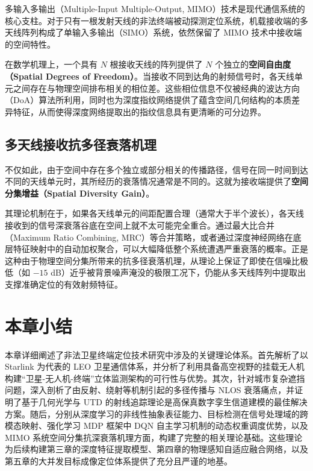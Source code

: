 多输入多输出（Multiple-Input Multiple-Output, MIMO）技术是现代通信系统的核心支柱。对于只有一根发射天线的非法终端被动探测定位系统，机载接收端的多天线阵列构成了单输入多输出（SIMO）系统，依然保留了 MIMO 技术中接收端的空间特性。

在数学机理上，一个具有 $N$ 根接收天线的阵列提供了 $N$ 个独立的\textbf{空间自由度（Spatial Degrees of Freedom）}。当接收不同到达角的射频信号时，各天线单元之间存在与物理空间排布相关的相位差。这些相位信息不仅被经典的波达方向（DoA）算法所利用，同时也为深度指纹网络提供了蕴含空间几何结构的本质差异特征，从而使得深度网络提取出的指纹信息具有更清晰的可分边界。

\subsection{多天线接收抗多径衰落机理}

不仅如此，由于空间中存在多个独立或部分相关的传播路径，信号在同一时间到达不同的天线单元时，其所经历的衰落情况通常是不同的。这就为接收端提供了\textbf{空间分集增益（Spatial Diversity Gain）}。

其理论机制在于，如果各天线单元的间距配置合理（通常大于半个波长），各天线接收到的信号深衰落谷底在空间上就不太可能完全重合。通过最大比合并（Maximum Ratio Combining, MRC）等合并策略，或者通过深度神经网络在底层特征映射中的自动加权聚合，可以大幅降低整个系统遭遇严重衰落的概率。正是这种由于物理空间分集所带来的抗多径衰落机理，从理论上保证了即使在信噪比极低（如 $-15$ dB）近乎被背景噪声淹没的极限工况下，仍能从多天线阵列中提取出支撑准确定位的有效射频特征。

\section{本章小结}

本章详细阐述了非法卫星终端定位技术研究中涉及的关键理论体系。首先解析了以 Starlink 为代表的 LEO 卫星通信体系，并分析了利用具备高空视野的挂载无人机构建“卫星-无人机-终端”立体监测架构的可行性与优势。其次，针对城市复杂遮挡问题，深入剖析了由反射、绕射等机制引起的多径传播与 NLOS 衰落痛点，并证明了基于几何光学与 UTD 的射线追踪理论是高保真数字孪生信道建模的最佳解决方案。随后，分别从深度学习的非线性抽象表征能力、目标检测在信号处理域的跨模态映射、强化学习 MDP 框架中 DQN 自主学习机制的动态权重调度优势，以及 MIMO 系统空间分集抗深衰落机理方面，构建了完整的相关理论基础。这些理论为后续构建第三章的深度特征提取模型、第四章的物理感知自适应融合网络，以及第五章的大并发目标成像定位体系提供了充分且严谨的地基。
